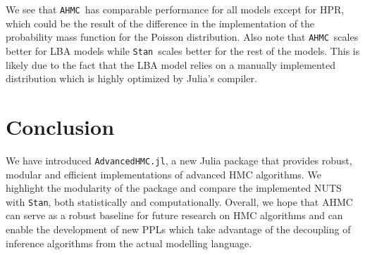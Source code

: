 \documentclass[tablecaption=bottom,wcp]{jmlr} %
\def\ahmc{\texttt{AHMC}}
\def\ahmcfull{\texttt{AdvancedHMC.jl}}
\def\stan{\texttt{Stan}}
\begin{document}
We see that \ahmc~has comparable performance for all models except for HPR, which could be the result of the difference in the implementation of the probability mass function for the Poisson distribution. Also note that \ahmc~scales better for LBA models while \stan~scales better for the rest of the models. This is likely due to the fact that the LBA model relies on a manually implemented distribution which is highly optimized by Julia's compiler.

\section{Conclusion}
We have introduced \ahmcfull, a new Julia package that provides robust, modular and efficient implementations of advanced HMC algorithms. 
We highlight the modularity of the package and compare the implemented NUTS with \stan, both statistically and computationally.
Overall, we hope that AHMC can serve as a robust baseline for future research on HMC algorithms and can enable the development of new PPLs which take advantage of the decoupling of inference algorithms from the actual modelling language.


\end{document}
